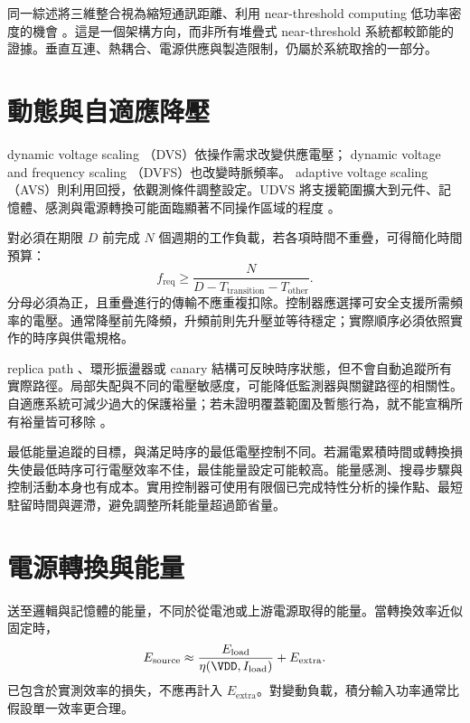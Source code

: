 同一綜述將三維整合視為縮短通訊距離、利用 near-threshold computing 低功率密度的機會 \cite{dreslinski2010}。這是一個架構方向，而非所有堆疊式 near-threshold 系統都較節能的證據。垂直互連、熱耦合、電源供應與製造限制，仍屬於系統取捨的一部分。

\section{動態與自適應降壓}
 dynamic voltage scaling （DVS）依操作需求改變供應電壓； dynamic voltage and frequency scaling （DVFS）也改變時脈頻率。 adaptive voltage scaling （AVS）則利用回授，依觀測條件調整設定。UDVS 將支援範圍擴大到元件、記憶體、感測與電源轉換可能面臨顯著不同操作區域的程度 \cite{udvs2010}。

對必須在期限 $D$ 前完成 $N$ 個週期的工作負載，若各項時間不重疊，可得簡化時間預算：
\begin{equation}
f_{\mathrm{req}}\geq\frac{N}{D-T_{\mathrm{transition}}-T_{\mathrm{other}}}.
\end{equation}
分母必須為正，且重疊進行的傳輸不應重複扣除。控制器應選擇可安全支援所需頻率的電壓。通常降壓前先降頻，升頻前則先升壓並等待穩定；實際順序必須依照實作的時序與供電規格。

 replica path 、環形振盪器或 canary 結構可反映時序狀態，但不會自動追蹤所有實際路徑。局部失配與不同的電壓敏感度，可能降低監測器與關鍵路徑的相關性。自適應系統可減少過大的保護裕量；若未證明覆蓋範圍及暫態行為，就不能宣稱所有裕量皆可移除 \cite{gonzalez1997,udvs2010}。

最低能量追蹤的目標，與滿足時序的最低電壓控制不同。若漏電累積時間或轉換損失使最低時序可行電壓效率不佳，最佳能量設定可能較高。能量感測、搜尋步驟與控制活動本身也有成本。實用控制器可使用有限個已完成特性分析的操作點、最短駐留時間與遲滯，避免調整所耗能量超過節省量。

\clearpage
\section{電源轉換與能量}
送至邏輯與記憶體的能量，不同於從電池或上游電源取得的能量。當轉換效率近似固定時，
\begin{equation}
E_{\mathrm{source}}\approx\frac{E_{\mathrm{load}}}{\eta(\VDD,I_{\mathrm{load}})}+E_{\mathrm{extra}}.
\label{eq:source}
\end{equation}
已包含於實測效率的損失，不應再計入 $E_{\mathrm{extra}}$。對變動負載，積分輸入功率通常比假設單一效率更合理。


